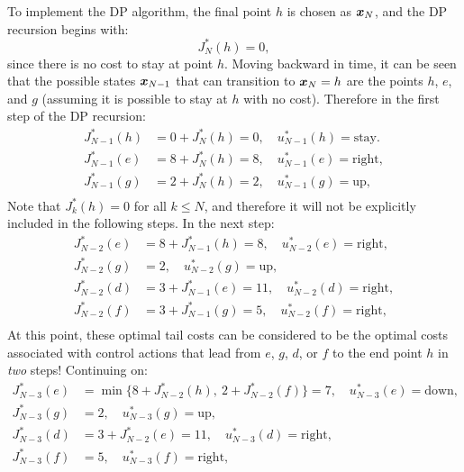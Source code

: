 \begin{example}
To implement the DP algorithm, the final point $h$ is chosen as $\bm{x}_N$, and the DP recursion begins with:
\begin{equation*}
    J^*_N(h) = 0,
\end{equation*}
since there is no cost to stay at point $h$.
Moving backward in time, it can be seen that the possible states $\bm{x}_{N-1}$ that can transition to $\bm{x}_N = h$ are the points $h$, $e$, and $g$ (assuming it is possible to stay at $h$ with no cost). Therefore in the first step of the DP recursion:
\begin{equation*}
\begin{split}
J^*_{N-1}(h) &= 0 + J^*_N(h) = 0, \quad u^*_{N-1}(h) = \text{stay}. \\
J^*_{N-1}(e) &= 8 + J^*_N(h) = 8, \quad u^*_{N-1}(e) = \text{right}, \\
J^*_{N-1}(g) &= 2 + J^*_N(h) = 2, \quad u^*_{N-1}(g) = \text{up}, \\
\end{split}
\end{equation*}
Note that $J^*_k(h) = 0$ for all $k \leq N$, and therefore it will not be explicitly included in the following steps. In the next step:
\begin{equation*}
\begin{split}
J^*_{N-2}(e) &= 8 + J^*_{N-1}(h) = 8, \quad u^*_{N-2}(e) = \text{right}, \\
J^*_{N-2}(g) &= 2, \quad u^*_{N-2}(g) = \text{up}, \\
J^*_{N-2}(d) &= 3 + J^*_{N-1}(e) = 11, \quad u^*_{N-2}(d) = \text{right}, \\
J^*_{N-2}(f) &= 3 + J^*_{N-1}(g) = 5, \quad u^*_{N-2}(f) = \text{right}, \\
\end{split}
\end{equation*}
At this point, these optimal tail costs can be considered to be the optimal costs associated with control actions that lead from $e$, $g$, $d$, or $f$ to the end point $h$ in \textit{two} steps! Continuing on:
\begin{equation*}
\begin{split}
J^*_{N-3}(e) &= \min \{8 + J^*_{N-2}(h), \:2 + J^*_{N-2}(f)\} = 7, \quad u^*_{N-3}(e) = \text{down}, \\
J^*_{N-3}(g) &= 2, \quad u^*_{N-3}(g) = \text{up},  \\
J^*_{N-3}(d) &= 3 + J^*_{N-2}(e) = 11, \quad u^*_{N-3}(d) = \text{right}, \\
J^*_{N-3}(f) & = 5, \quad u^*_{N-3}(f) = \text{right}, \\

\end{split}
\end{equation*}
\end{example}
